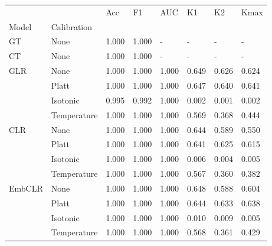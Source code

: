 \begin{tabular}{llllllll}
\toprule
 &  & Acc & F1 & AUC & K1 & K2 & Kmax \\
Model & Calibration &  &  &  &  &  &  \\
\midrule
GT & None & 1.000 & 1.000 & - & - & - & - \\
\cline{1-8}
CT & None & 1.000 & 1.000 & - & - & - & - \\
\cline{1-8}
\multirow[t]{4}{*}{GLR} & None & 1.000 & 1.000 & 1.000 & 0.649 & 0.626 & 0.624 \\
 & Platt & 1.000 & 1.000 & 1.000 & 0.647 & 0.640 & 0.641 \\
 & Isotonic & 0.995 & 0.992 & 1.000 & 0.002 & 0.001 & 0.002 \\
 & Temperature & 1.000 & 1.000 & 1.000 & 0.569 & 0.368 & 0.444 \\
\cline{1-8}
\multirow[t]{4}{*}{CLR} & None & 1.000 & 1.000 & 1.000 & 0.644 & 0.589 & 0.550 \\
 & Platt & 1.000 & 1.000 & 1.000 & 0.641 & 0.625 & 0.615 \\
 & Isotonic & 1.000 & 1.000 & 1.000 & 0.006 & 0.004 & 0.005 \\
 & Temperature & 1.000 & 1.000 & 1.000 & 0.567 & 0.360 & 0.382 \\
\cline{1-8}
\multirow[t]{4}{*}{EmbCLR} & None & 1.000 & 1.000 & 1.000 & 0.648 & 0.588 & 0.604 \\
 & Platt & 1.000 & 1.000 & 1.000 & 0.644 & 0.633 & 0.638 \\
 & Isotonic & 1.000 & 1.000 & 1.000 & 0.010 & 0.009 & 0.005 \\
 & Temperature & 1.000 & 1.000 & 1.000 & 0.568 & 0.361 & 0.429 \\
\cline{1-8}
\bottomrule
\end{tabular}
